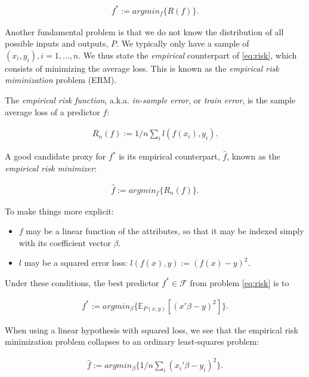 \documentclass[]{book}
\providecommand{\tightlist}{%
  \setlength{\itemsep}{0pt}\setlength{\parskip}{0pt}}
\theoremstyle{definition}
\theoremstyle{definition}
\theoremstyle{definition}
\theoremstyle{remark}
\let\BeginKnitrBlock\begin \let\EndKnitrBlock\end
\begin{document}
\begin{align}
  f^* := argmin_f \{R(f)\}.
  \label{eq:risk}  
\end{align}

Another fundamental problem is that we do not know the distribution of
all possible inputs and outputs, \(P\). We typically only have a sample
of \((x_i,y_i), i=1,\dots,n\). We thus state the \emph{empirical}
counterpart of \eqref{eq:risk}, which consists of minimizing the average
loss. This is known as the \emph{empirical risk miminization} problem
(ERM).

\BeginKnitrBlock{definition}[Empirical Risk]
\protect\hypertarget{def:unnamed-chunk-186}{}{\label{def:unnamed-chunk-186}
{} }The \emph{empirical risk function},
a.k.a. \emph{in-sample error}, or \emph{train error}, is the sample
average loss of a predictor \(f\):

\begin{align}
  R_n(f):= 1/n \sum_i l(f(x_i),y_i).
\end{align}
\EndKnitrBlock{definition}

A good candidate proxy for \(f^*\) is its empirical counterpart,
\(\hat f\), known as the \emph{empirical risk minimizer}:

\begin{align}
  \hat f := argmin_f \{ R_n(f) \}.
  \label{eq:erm}  
\end{align}

To make things more explicit:

\begin{itemize}
\tightlist
\item
  \(f\) may be a linear function of the attributes, so that it may be
  indexed simply with its coefficient vector \(\beta\).
\item
  \(l\) may be a squared error loss: \(l(f(x),y):=(f(x)-y)^2\).
\end{itemize}

Under these conditions, the best predictor \(f^* \in \mathcal{F}\) from
problem \eqref{eq:risk} is to

\begin{align}
  f^* := argmin_\beta \{ \mathbb{E}_{P(x,y)}[(x'\beta-y)^2] \}.
\end{align}

When using a linear hypothesis with squared loss, we see that the
empirical risk minimization problem collapses to an ordinary
least-squares problem:

\begin{align}
  \hat f := argmin_\beta \{1/n \sum_i (x_i'\beta - y_i)^2 \}.
\end{align}
\end{document}
